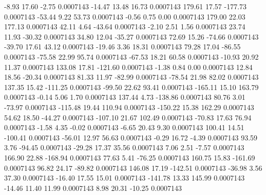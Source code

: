        -8.93       17.60       -2.75     0.0007143
      -14.47       13.48       16.73     0.0007143
      179.61       17.57     -177.73     0.0007143
      -53.44        9.22       53.73     0.0007143
       -0.56        0.75        0.00     0.0007143
      179.00       22.03      177.13     0.0007143
       42.11        4.64      -43.64     0.0007143
       -2.10        2.51        1.56     0.0007143
       23.74       11.93      -30.32     0.0007143
       34.80       12.04      -35.27     0.0007143
       72.69       15.26      -74.66     0.0007143
      -39.70       17.61       43.12     0.0007143
      -19.46        3.36       18.31     0.0007143
       79.28       17.04      -86.55     0.0007143
      -75.58       22.99       95.74     0.0007143
      -67.53       18.21       60.58     0.0007143
      -10.93       20.92       11.37     0.0007143
      133.08       17.81     -121.60     0.0007143
       -1.38        0.84        0.00     0.0007143
       12.84       18.56      -20.34     0.0007143
       81.33       11.97      -82.99     0.0007143
      -78.54       21.98       82.02     0.0007143
      137.35       15.42     -111.25     0.0007143
      -99.50       22.62       93.41     0.0007143
     -165.11       15.10      163.79     0.0007143
       -0.14        5.06        1.70     0.0007143
      137.44        4.73     -138.86     0.0007143
       80.76        3.01      -73.97     0.0007143
     -115.48       19.44      110.94     0.0007143
     -150.22       15.38      162.29     0.0007143
       54.62       18.50      -44.27     0.0007143
     -107.10       21.67      102.49     0.0007143
      -70.83       17.63       76.94     0.0007143
       -1.58        4.35       -0.02     0.0007143
       -6.65       20.43        9.30     0.0007143
      100.41       14.51     -100.41     0.0007143
      -56.01       12.97       56.63     0.0007143
       -0.29       16.72       -4.39     0.0007143
       93.59        3.76      -94.45     0.0007143
      -29.28       17.37       35.56     0.0007143
        7.06        2.51       -7.57     0.0007143
      166.90       22.88     -168.94     0.0007143
       77.63        5.41      -76.25     0.0007143
      160.75       15.83     -161.69     0.0007143
       96.82       24.17      -89.82     0.0007143
      146.08       17.19     -142.51     0.0007143
      -36.98        3.56       37.30     0.0007143
      -16.40       17.55       15.01     0.0007143
     -141.78       13.33      145.99     0.0007143
      -14.46       11.40       11.99     0.0007143
        8.98       20.31      -10.25     0.0007143
